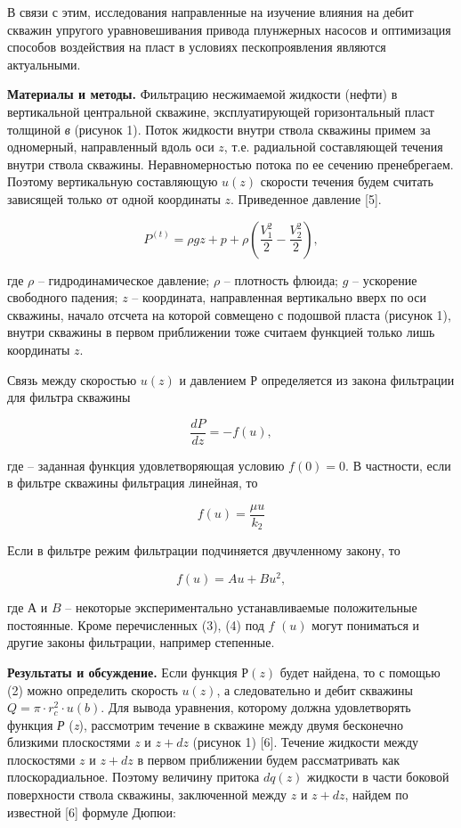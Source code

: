 \begin{multicols}{2}
В связи с этим, исследования направленные на изучение влияния на дебит
скважин упругого уравновешивания привода плунжерных насосов и
оптимизация способов воздействия на пласт в условиях пескопроявления
являются актуальными.

{\bfseries Материалы и методы.} Фильтрацию несжимаемой жидкости (нефти) в
вертикальной центральной скважине, эксплуатирующей горизонтальный пласт
толщиной \emph{в} (рисунок 1). Поток жидкости внутри ствола скважины
примем за одномерный, направленный вдоль оси $z$, т.е. радиальной
составляющей течения внутри ствола скважины. Неравномерностью потока по
ее сечению пренебрегаем. Поэтому вертикальную составляющую $u(z)$
скорости течения будем считать зависящей только от одной координаты
$z$. Приведенное давление {[}5{]}.

\begin{equation}
P^{(t)}=\rho gz+p+\rho\left(\frac{V_1^2}{2}-\frac{V_2^2}{2}\right),
\end{equation}

где $\rho$ -- гидродинамическое давление; $\rho$ -- плотность
флюида; $g$ -- ускорение свободного падения; $z$ --
координата, направленная вертикально вверх по оси скважины, начало
отсчета на которой совмещено с подошвой пласта (рисунок 1), внутри
скважины в первом приближении тоже считаем функцией только лишь
координаты $z$.

Связь между скоростью $u(z)$ и давлением $Р$ определяется из
закона фильтрации для фильтра скважины

\begin{equation}
\frac{dP}{dz}=-f(u),
\end{equation}

где 
-- заданная функция удовлетворяющая условию $f(0)=0$. В частности,
если в фильтре скважины фильтрация линейная, то

\begin{equation}
f(u)=\frac{\mu u}{k_2}
\end{equation}

Если в фильтре режим фильтрации подчиняется двучленному закону, то

\begin{equation}
f(u)=Au+Bu^2,
\end{equation}

где $А$ и $B$ -- некоторые экспериментально устанавливаемые
положительные постоянные. Кроме перечисленных (3), (4) под $f$
$(u)$ могут пониматься и другие законы фильтрации, например
степенные.

{\bfseries Результаты и обсуждение.} Если функция $Р(z)$ будет
найдена, то с помощью (2) можно определить скорость $u(z)$,
а следовательно и дебит скважины $Q=\pi\cdot r_c^2\cdot u(b)$. Для
вывода уравнения, которому должна удовлетворять функция \emph{Р}
(\emph{z}), рассмотрим течение в скважине между двумя бесконечно
близкими плоскостями $z$ и $z+dz$ (рисунок 1) {[}6{]}. Течение
жидкости между плоскостями $z$ и $z+dz$ в первом приближении
будем рассматривать как плоскорадиальное. Поэтому величину притока
$dq(z)$ жидкости в части боковой поверхности ствола
скважины, заключенной между $z$ и $z+dz$, найдем по
известной {[}6{]} формуле Дюпюи:


\end{multicols}

